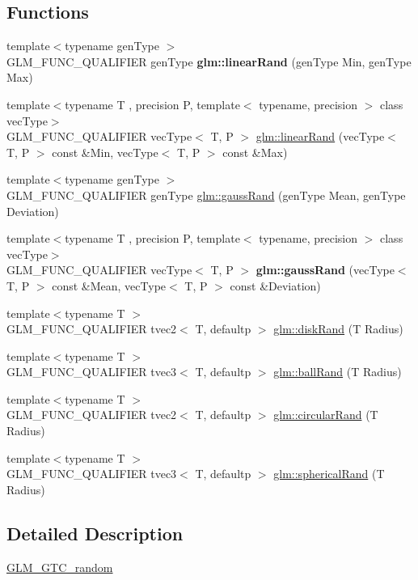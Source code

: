 \subsection*{Functions}
\begin{DoxyCompactItemize}
\item 
\mbox{\label{random_8inl_ad60fbcaa8da896b6f2cdd0aa302b96a4}} 
{\footnotesize template$<$typename gen\+Type $>$ }\\G\+L\+M\+\_\+\+F\+U\+N\+C\+\_\+\+Q\+U\+A\+L\+I\+F\+I\+ER gen\+Type {\bfseries glm\+::linear\+Rand} (gen\+Type Min, gen\+Type Max)
\item 
{\footnotesize template$<$typename T , precision P, template$<$ typename, precision $>$ class vec\+Type$>$ }\\G\+L\+M\+\_\+\+F\+U\+N\+C\+\_\+\+Q\+U\+A\+L\+I\+F\+I\+ER vec\+Type$<$ T, P $>$ \hyperlink{group__gtc__random_gaba9cec867916d894d794a32897b7fdfd}{glm\+::linear\+Rand} (vec\+Type$<$ T, P $>$ const \&Min, vec\+Type$<$ T, P $>$ const \&Max)
\item 
{\footnotesize template$<$typename gen\+Type $>$ }\\G\+L\+M\+\_\+\+F\+U\+N\+C\+\_\+\+Q\+U\+A\+L\+I\+F\+I\+ER gen\+Type \hyperlink{group__gtc__random_ga5193a83e49e4fdc5652c084711083574}{glm\+::gauss\+Rand} (gen\+Type Mean, gen\+Type Deviation)
\item 
\mbox{\label{random_8inl_adc010d4dd74cff264ee912f72de1adb9}} 
{\footnotesize template$<$typename T , precision P, template$<$ typename, precision $>$ class vec\+Type$>$ }\\G\+L\+M\+\_\+\+F\+U\+N\+C\+\_\+\+Q\+U\+A\+L\+I\+F\+I\+ER vec\+Type$<$ T, P $>$ {\bfseries glm\+::gauss\+Rand} (vec\+Type$<$ T, P $>$ const \&Mean, vec\+Type$<$ T, P $>$ const \&Deviation)
\item 
{\footnotesize template$<$typename T $>$ }\\G\+L\+M\+\_\+\+F\+U\+N\+C\+\_\+\+Q\+U\+A\+L\+I\+F\+I\+ER tvec2$<$ T, defaultp $>$ \hyperlink{group__gtc__random_gad3a3ee7d26502a31ba552cb627a68606}{glm\+::disk\+Rand} (T Radius)
\item 
{\footnotesize template$<$typename T $>$ }\\G\+L\+M\+\_\+\+F\+U\+N\+C\+\_\+\+Q\+U\+A\+L\+I\+F\+I\+ER tvec3$<$ T, defaultp $>$ \hyperlink{group__gtc__random_ga5506dee301160e3a06aef9b9bc7a0a83}{glm\+::ball\+Rand} (T Radius)
\item 
{\footnotesize template$<$typename T $>$ }\\G\+L\+M\+\_\+\+F\+U\+N\+C\+\_\+\+Q\+U\+A\+L\+I\+F\+I\+ER tvec2$<$ T, defaultp $>$ \hyperlink{group__gtc__random_gae989c26a2899b2fb7444abe7c275c29c}{glm\+::circular\+Rand} (T Radius)
\item 
{\footnotesize template$<$typename T $>$ }\\G\+L\+M\+\_\+\+F\+U\+N\+C\+\_\+\+Q\+U\+A\+L\+I\+F\+I\+ER tvec3$<$ T, defaultp $>$ \hyperlink{group__gtc__random_gaa9a6fc2d7a295b3857f7db23b1053d9d}{glm\+::spherical\+Rand} (T Radius)
\end{DoxyCompactItemize}


\subsection{Detailed Description}
\hyperlink{group__gtc__random}{G\+L\+M\+\_\+\+G\+T\+C\+\_\+random} 
